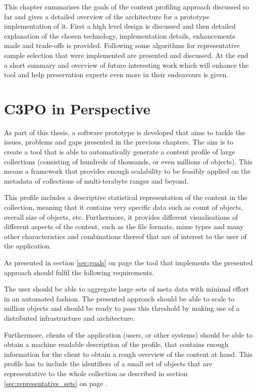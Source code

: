 This chapter summarises the goals of the content profiling approach discussed so far and gives a detailed overview of the architecture for a prototype implementation of it. First a high level design is discussed and then detailed explanation of the chosen technology, implementation details, enhancements made and trade-offs is provided. Following some algorithms for representative sample selection that were implemented are presented and discussed. At the end a short summary and overview of future interesting work which will enhance the tool and help preservation experts even more in their endeavours is given.

\section{C3PO in Perspective}
As part of this thesis, a software prototype is developed that aims to tackle the issues, problems and gaps presented in the previous chapters. The aim is to create a tool that is able to automatically generate a content profile of large collections (consisting of hundreds of thousands, or even millions of objects). This means a framework that provides enough scalability to be feasibly applied on the metadata of collections of multi-terabyte ranges and beyond.

This profile includes a descriptive statistical representation of the content in the collection, meaning that it contains very specific data such as count of objects, overall size of objects, etc. Furthermore, it provides different visualisations of different aspects of the content, such as the file formats, mime types and many other characteristics and combinations thereof that are of interest to the user of the application.

As presented in section \ref{sec:goals} on page \pageref{sec:goals} the tool that implements the presented approach should fulfil the following requirements.

The user should be able to aggregate large sets of meta data with minimal effort in an automated fashion. The presented approach should be able to scale to million objects and should be ready to pass this threshold by making use of a distributed infrastructure and architecture.

Furthermore, clients of the application (users, or other systems) should be able to obtain a machine readable description of the profile, that contains enough information for the client to obtain a rough overview of the content at hand. This profile has to include the identifiers of a small set of objects that are representative to the whole collection as described in section \ref{sec:representative_sets} on page \pageref{sec:representative_sets}.

